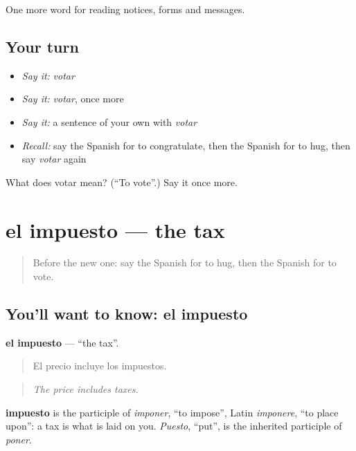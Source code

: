 \begin{grammarlens}[title={What you've built}]
One more word for reading notices, forms and messages.
\end{grammarlens}

\subsection*{Your turn}
\begin{itemize}
\raggedright
  \item \emph{Say it:} \emph{votar}
  \item \emph{Say it:} \emph{votar}, once more
  \item \emph{Say it:} a sentence of your own with \emph{votar}
  \item \emph{Recall:} say the Spanish for to congratulate, then the Spanish for to hug, then say \emph{votar} again
\end{itemize}

\begin{tcolorbox}[breakable,colback=teal!4,colframe=teal!35!black,title={Before you move on}]
What does votar mean? (\textquotedblleft{}To vote\textquotedblright{}.) Say it once more.
\end{tcolorbox}
\section[el impuesto]{el impuesto — the tax}

\label{lesson:ES-C507-impuesto}



\begin{quote}
Before the new one: say the Spanish for to hug, then the Spanish for to vote.
\end{quote}

\subsection*{You'll want to know: el impuesto}
\textbf{el impuesto} — \textquotedblleft{}the tax\textquotedblright{}.

\begin{quote}
El precio incluye los impuestos.
\end{quote}

\begin{quote}
\emph{The price includes taxes.}
\end{quote}

\begin{cousinweb}
\textbf{impuesto} is the participle of \emph{imponer}, \textquotedblleft{}to impose\textquotedblright{}, Latin \emph{imponere}, \textquotedblleft{}to place upon\textquotedblright{}: a tax is what is laid on you. \emph{Puesto}, \textquotedblleft{}put\textquotedblright{}, is the inherited participle of \emph{poner}.
\end{cousinweb}

